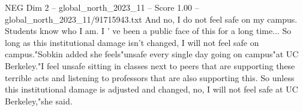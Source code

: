 \begin{textsample}{NEG Dim 2 – global\_north\_2023\_11 – Score 1.00 – global\_north\_2023\_11/91715943.txt}
And no, I do not feel safe on my campus.
Students know who I am.
I ' ve been a public face of this for a long time...
So long as this institutional damage isn't changed, I will not feel safe on campus."Sobkin added she feels"unsafe every single day going on campus"at UC Berkeley."I feel unsafe sitting in classes next to peers that are supporting these terrible acts and listening to professors that are also supporting this.
So unless this institutional damage is adjusted and changed, no, I will not feel safe at UC Berkeley,"she said.

\end{textsample}
